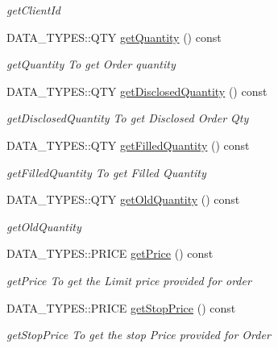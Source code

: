 \begin{DoxyCompactItemize}
\begin{DoxyCompactList}\small\item\em get\-Client\-Id \end{DoxyCompactList}\item 
D\-A\-T\-A\-\_\-\-T\-Y\-P\-E\-S\-::\-Q\-T\-Y \hyperlink{class_a_p_i2_1_1_single_order_ae83e842fe2651eda4b45179da81f7d34}{get\-Quantity} () const 
\begin{DoxyCompactList}\small\item\em get\-Quantity To get Order quantity \end{DoxyCompactList}\item 
D\-A\-T\-A\-\_\-\-T\-Y\-P\-E\-S\-::\-Q\-T\-Y \hyperlink{class_a_p_i2_1_1_single_order_adcd794066bd9c5a4ef8ac4d4dc1b64e7}{get\-Disclosed\-Quantity} () const 
\begin{DoxyCompactList}\small\item\em get\-Disclosed\-Quantity To get Disclosed Order Qty \end{DoxyCompactList}\item 
D\-A\-T\-A\-\_\-\-T\-Y\-P\-E\-S\-::\-Q\-T\-Y \hyperlink{class_a_p_i2_1_1_single_order_a9885de5b864534cb5ee210e9ebc165de}{get\-Filled\-Quantity} () const 
\begin{DoxyCompactList}\small\item\em get\-Filled\-Quantity To get Filled Quantity \end{DoxyCompactList}\item 
D\-A\-T\-A\-\_\-\-T\-Y\-P\-E\-S\-::\-Q\-T\-Y \hyperlink{class_a_p_i2_1_1_single_order_ad0eb23ff72ec36877382651aab12ebc0}{get\-Old\-Quantity} () const 
\begin{DoxyCompactList}\small\item\em get\-Old\-Quantity \end{DoxyCompactList}\item 
D\-A\-T\-A\-\_\-\-T\-Y\-P\-E\-S\-::\-P\-R\-I\-C\-E \hyperlink{class_a_p_i2_1_1_single_order_a94e904d20765dbe9dc8f551e9131a86a}{get\-Price} () const 
\begin{DoxyCompactList}\small\item\em get\-Price To get the Limit price provided for order \end{DoxyCompactList}\item 
D\-A\-T\-A\-\_\-\-T\-Y\-P\-E\-S\-::\-P\-R\-I\-C\-E \hyperlink{class_a_p_i2_1_1_single_order_a0056cb82362c1929781c08282c74dbb4}{get\-Stop\-Price} () const 
\begin{DoxyCompactList}\small\item\em get\-Stop\-Price To get the stop Price provided for Order \end{DoxyCompactList}\item 

\end{DoxyCompactItemize}
